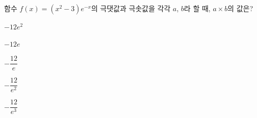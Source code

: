 함수 $f(x)=(x^2-3)e^{-x}$의 극댓값과 극솟값을 각각 $a$, $b$라 할 때, $a\times b$의 값은?
\begin{choices32}{\rule[-3ex]{0pt}{8ex}$-12e^2$}{\rule[-3ex]{0pt}{8ex}$-12e$}{\rule[-3ex]{0pt}{8ex}$-\dfrac{12}{e}$}{\rule[-3ex]{0pt}{8ex}$-\dfrac{12}{e^2}$}{\rule[-3ex]{0pt}{8ex}$-\dfrac{12}{e^3}$}\end{choices32}
